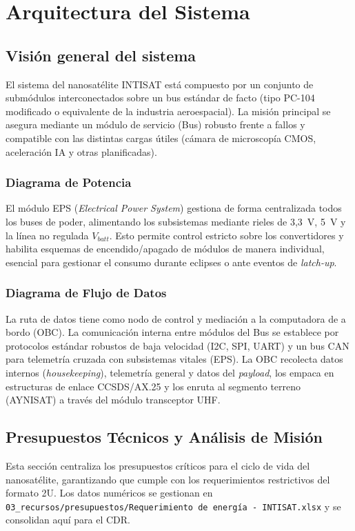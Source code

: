 \chapter{Arquitectura del Sistema}

\section{Visión general del sistema}
El sistema del nanosatélite INTISAT está compuesto por un conjunto de submódulos interconectados sobre un bus estándar de facto (tipo PC-104 modificado o equivalente de la industria aeroespacial). La misión principal se asegura mediante un módulo de servicio (Bus) robusto frente a fallos y compatible con las distintas cargas útiles (cámara de microscopía CMOS, aceleración IA y otras planificadas).

\subsection{Diagrama de Potencia}
El módulo EPS (\textit{Electrical Power System}) gestiona de forma centralizada todos los buses de poder, alimentando los subsistemas mediante rieles de 3{,}3~V, 5~V y la línea no regulada $V_{batt}$. Esto permite control estricto sobre los convertidores y habilita esquemas de encendido/apagado de módulos de manera individual, esencial para gestionar el consumo durante eclipses o ante eventos de \textit{latch-up}.

\subsection{Diagrama de Flujo de Datos}
La ruta de datos tiene como nodo de control y mediación a la computadora de a bordo (OBC). La comunicación interna entre módulos del Bus se establece por protocolos estándar robustos de baja velocidad (I2C, SPI, UART) y un bus CAN para telemetría cruzada con subsistemas vitales (EPS). La OBC recolecta datos internos (\textit{housekeeping}), telemetría general y datos del \textit{payload}, los empaca en estructuras de enlace CCSDS/AX.25 y los enruta al segmento terreno (AYNISAT) a través del módulo transceptor UHF.


\section{Presupuestos Técnicos y Análisis de Misión}
Esta sección centraliza los presupuestos críticos para el ciclo de vida del nanosatélite, garantizando que cumple con los requerimientos restrictivos del formato 2U. Los datos numéricos se gestionan en \texttt{03\_recursos/presupuestos/Requerimiento de energía - INTISAT.xlsx} y se consolidan aquí para el CDR.

